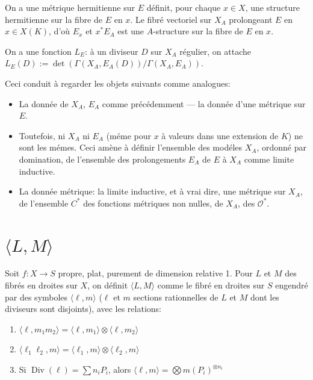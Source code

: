 \documentclass[11pt,a4paper]{article}
\theoremstyle{plain}
\theoremstyle{definition}
\DeclareMathOperator{\Div}{Div}
\newcommand{\cO}{\mathcal{O}}
\begin{document}
\medskip

On a une m\'etrique hermitienne sur $E$ d\'efinit, pour chaque $x \in X$, une structure hermitienne sur la fibre de $E$ en $x$. Le fibr\'e vectoriel sur $X_A$ prolongeant $E$ en $x \in X(K)$, d'o\`u $E_x$ et $x^* E_A$ est une $A$-structure sur la fibre de $E$ en $x$.

On a une fonction $L_E$: \`a un diviseur $D$ sur $X_A$ r\'egulier, on attache $L_E(D) := \det(\Gamma(X_A, E_A(D))/\Gamma(X_A, E_A))$.

Ceci conduit \`a regarder les objets suivants comme analogues:
\begin{itemize}
\item[(a)] La donn\'ee de $X_A$, $E_A$ comme pr\'ec\'edemment --- la donn\'ee d'une m\'etrique sur $E$.
\item[(b)] Toutefois, ni $X_A$ ni $E_A$ (m\'eme pour $x$ \`a valeurs dans une extension de $K$) ne sont les m\'emes. Ceci am\`ene \`a d\'efinir l'ensemble des mod\'eles $X_A$, ordonn\'e par domination, de l'ensemble des prolongements $E_A$ de $E$ \`a $X_A$ comme limite inductive.
\item[(c)] La donn\'ee m\'etrique: la limite inductive, et \`a vrai dire, une m\'etrique sur $X_A$, de l'ensemble $C^*$ des fonctions m\'etriques non nulles, de $X_A$, des $\cO^*$.
\end{itemize}

\section{$\langle L, M \rangle$}

Soit $f: X \to S$ propre, plat, purement de dimension relative 1. Pour $L$ et $M$ des fibr\'es en droites sur $X$, on d\'efinit $\langle L, M \rangle$ comme le fibr\'e en droites sur $S$ engendr\'e par des symboles $\langle \ell, m \rangle$ ($\ell$ et $m$ sections rationnelles de $L$ et $M$ dont les diviseurs sont disjoints), avec les relations:
\begin{enumerate}
\item[(i)] $\langle \ell, m_1 m_2 \rangle = \langle \ell, m_1 \rangle \otimes \langle \ell, m_2 \rangle$
\item[(ii)] $\langle \ell_1 \ell_2, m \rangle = \langle \ell_1, m \rangle \otimes \langle \ell_2, m \rangle$
\item[(iii)] Si $\Div(\ell) = \sum n_i P_i$, alors $\langle \ell, m \rangle = \bigotimes m(P_i)^{\otimes n_i}$
\end{enumerate}
\end{document}
